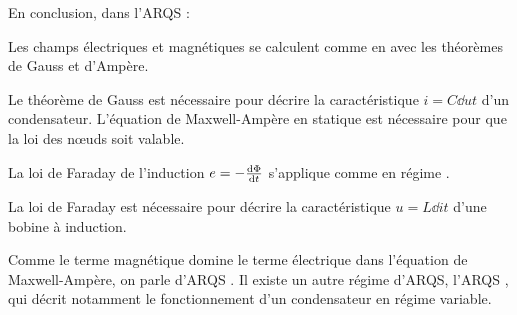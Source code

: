 \documentclass[12pt,fancy]{cours}
\begin{document}
En conclusion, dans l’ARQS :
\begin{liste}
  \item Les champs électriques et magnétiques se calculent comme en  avec les théorèmes de Gauss et d'Ampère.
  \begin{remarque}
    Le théorème de Gauss est nécessaire pour décrire la caractéristique $i=C\dd{u}{t}$ d’un condensateur. L’équation de Maxwell-Ampère en statique est nécessaire pour que la loi des nœuds soit valable.
  \end{remarque}
  \item La loi de Faraday de l’induction $e=-\frac{\mathrm{d} \Phi}{\mathrm{d} t}$ s'applique comme en régime .
\begin{remarque}
    La loi de Faraday est nécessaire pour décrire la caractéristique $u=L\dd{i}{t}$ d’une bobine à induction.
\end{remarque}

\end{liste}

\begin{remarque}
  Comme le terme magnétique domine le terme électrique dans l’équation de Maxwell-Ampère, on parle d’ARQS . Il existe un autre régime d’ARQS, l’ARQS , qui décrit notamment le fonctionnement d’un condensateur en régime variable.
\end{remarque}
\end{document}
